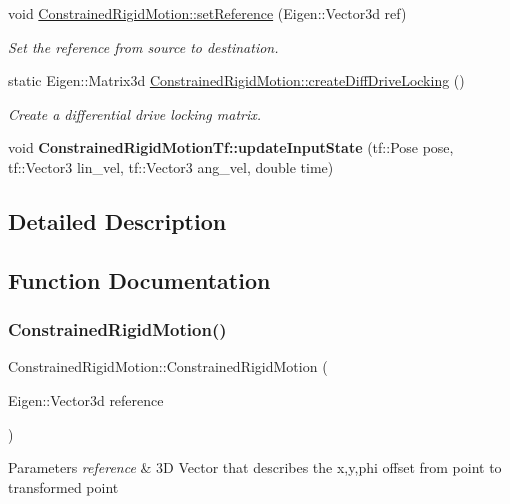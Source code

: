 \begin{DoxyCompactItemize}
void \hyperlink{group__RigidMotion_gac71f6e395c1d63f54cfb837b5526236b}{Constrained\+Rigid\+Motion\+::set\+Reference} (Eigen\+::\+Vector3d ref)
\begin{DoxyCompactList}\small\item\em Set the reference from source to destination. \end{DoxyCompactList}\item 
static Eigen\+::\+Matrix3d \hyperlink{group__RigidMotion_gad4fb6e13815454559ec7e52b291489af}{Constrained\+Rigid\+Motion\+::create\+Diff\+Drive\+Locking} ()
\begin{DoxyCompactList}\small\item\em Create a differential drive locking matrix. \end{DoxyCompactList}\item 
\mbox{\label{group__RigidMotion_gabb5eee0f91ee59d0eda733f8d5769094}} 
void {\bfseries Constrained\+Rigid\+Motion\+Tf\+::update\+Input\+State} (tf\+::\+Pose pose, tf\+::\+Vector3 lin\+\_\+vel, tf\+::\+Vector3 ang\+\_\+vel, double time)
\end{DoxyCompactItemize}


\subsection{Detailed Description}


\subsection{Function Documentation}
\mbox{\label{group__RigidMotion_ga603d9727e46dc49dcf22b24870d15779}} 
\subsubsection{\texorpdfstring{Constrained\+Rigid\+Motion()}{ConstrainedRigidMotion()}}
{\footnotesize\ttfamily Constrained\+Rigid\+Motion\+::\+Constrained\+Rigid\+Motion (\begin{DoxyParamCaption}\item[{Eigen\+::\+Vector3d}]{reference }\end{DoxyParamCaption})}


\begin{DoxyParams}{Parameters}
{\em reference} & 3D Vector that describes the x,y,phi offset from point to transformed point \\
\hline
\end{DoxyParams}
\mbox{\label{group__RigidMotion_gad4fb6e13815454559ec7e52b291489af}} 

